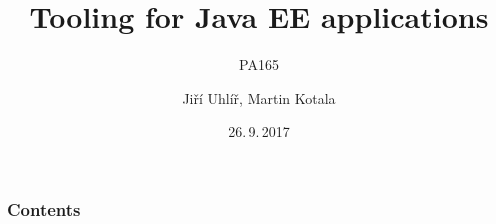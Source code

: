 \documentclass[pdf,compress]{beamer}
\title{Tooling for Java EE applications}
\subtitle{PA165}
\date{26.\,9.\,2017}
\author{Jiří Uhlíř, Martin Kotala}
\begin{document}
\frame{\titlepage}

\section[]{}
\begin{frame}
\frametitle{Contents}
\tableofcontents[hideallsubsections]
\end{frame}










\end{document}

